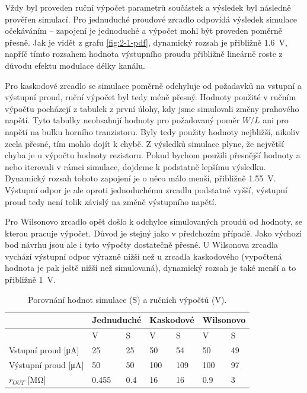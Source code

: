 \documentclass{protokol}
\begin{document}
  Vždy byl proveden ruční výpočet parametrů součástek a výsledek byl následně prověřen simulací. Pro jednuduché proudové zrcadlo odpovídá výsledek simulace očekáváním -- zapojení je jednoduché a výpočet mohl být proveden poměrně přesně. Jak je vidět z grafu \ref{fig:2-1-pdf}, dynamický rozsah je přibližně \qty{1.6}{V}, napříč tímto rozsahem hodnota výstupního proudu přibližně lineárně roste z důvodu efektu modulace délky kanálu.

  Pro kaskodové zrcadlo se simulace poměrně odchyluje od požadavků na vstupní a výstupní proud, ruční výpočet byl tedy méně přesný. Hodnoty použité v ručním výpočtu pocházejí z tabulek z první úlohy, kdy jsme simulovali změny prahového napětí. Tyto tabulky neobsahují hodnoty pro požadovaný poměr \(W/L\) ani pro napětí na bulku horního tranzistoru. Byly tedy použity hodnoty nejbližší, nikoliv zcela přesné, tím mohlo dojít k chybě. Z výsledků simulace plyne, že největší chyba je u výpočtu hodnoty rezistoru. Pokud bychom použili přesnější hodnoty a nebo iterovali v rámci simulace, dojdeme k podstatně lepšímu výsledku. Dynamický rozsah tohoto zapojení je o něco málo menší, přibližně \qty{1.55}{V}. Výstupní odpor je ale oproti jednoduchému zrcadlu podstatně vyšší, výstupní proud tedy není tolik závislý na změně výstupního napětí.

  Pro Wilsonovo zrcadlo opět došlo k odchylce simulovaných proudů od hodnoty, se kterou pracuje výpočet. Důvod je stejný jako v předchozím případě. Jako výchozí bod návrhu jsou ale i tyto výpočty dostatečně přesné. U Wilsonova zrcadla vychází výstupní odpor výrazně nižší než u zrcadla kaskodového (vypočtená hodnota je pak ještě nižší než simulovaná), dynamický rozsah je také menší a to přibližně \qty{1}{V}. 

\begin{table}[h!]
  \centering
  \def\arraystretch{1.2}
  \begin{tabular}{|l||ll||ll||ll|}
  \hline
                    & \multicolumn{2}{l||}{Jednuduché} & \multicolumn{2}{l||}{Kaskodové} & \multicolumn{2}{l|}{Wilsonovo} \\ \hline
                    & \multicolumn{1}{l|}{V} & S & \multicolumn{1}{l|}{V} & S & \multicolumn{1}{l|}{V} & S \\ \hline\hline
  Vstupní proud [\unit{\micro\ampere}]  & \multicolumn{1}{l|}{25}  &  25 & \multicolumn{1}{l|}{50}  & 54  & \multicolumn{1}{l|}{50}  & 49  \\ \hline
  Výstupní proud [\unit{\micro\ampere}] & \multicolumn{1}{l|}{50}  &  50 & \multicolumn{1}{l|}{100}  &  109 & \multicolumn{1}{l|}{100}  &  97 \\ \hline
  \(r_{OUT} \)  [\unit{\mega\ohm}]          & \multicolumn{1}{l|}{\num{0.455}}  &  \num{0.4} & \multicolumn{1}{l|}{\num{16}}  & 16  & \multicolumn{1}{l|}{\num{0.9}}  &  3 \\ \hline
  \end{tabular}
  \caption{Porovnání hodnot simulace (S) a ručních výpočtů (V).}
  \label{tab:1-1-2_hodnoty}
  \end{table}
\end{document}
